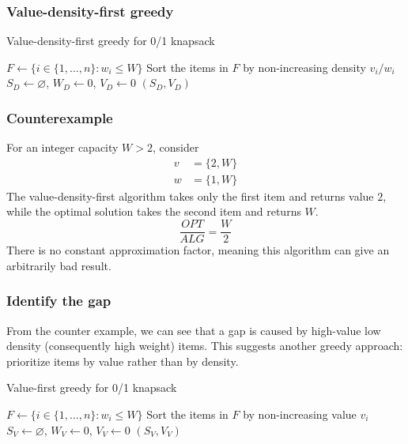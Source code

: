 \documentclass[10pt]{article}
\theoremstyle{definition}
\begin{document}
\begin{multicols*}{2}
\subsubsection*{Value-density-first greedy}

\begin{algorithm}[H]
  \caption{Value-density-first greedy for 0/1 knapsack}
  $F \gets \{i \in \{1,\ldots,n\}:w_i\leq W\}$\;
  Sort the items in $F$ by non-increasing density $v_i/w_i$\;
  $S_D \gets \varnothing$, $W_D \gets 0$, $V_D \gets 0$\;
  \Return $(S_D,V_D)$\;
\end{algorithm}

\subsubsection*{Counterexample}
For an integer capacity $W>2$, consider
\begin{align*}
  v &= \{2, W\}\\
  w &= \{1, W\}
\end{align*}
The value-density-first algorithm takes only the first item and returns value $2$, while the optimal solution takes the second item and returns $W$. 
\[\frac{OPT}{ALG} = \frac{W}{2}\]
There is no constant approximation factor, meaning this algorithm can give an arbitrarily bad result. 
\subsubsection*{Identify the gap}
From the counter example, we can see that a gap is caused by high-value low density (consequently high weight) items. 
This suggests another greedy approach: prioritize items by value rather than by density.


\begin{algorithm}[H]
  \caption{Value-first greedy for 0/1 knapsack}
  $F \gets \{i \in \{1,\ldots,n\}:w_i\leq W\}$\;
  Sort the items in $F$ by non-increasing value $v_i$\;
  $S_V \gets \varnothing$, $W_V \gets 0$, $V_V \gets 0$\;
  \Return $(S_V,V_V)$\;
\end{algorithm}


\end{multicols*}
\end{document}
